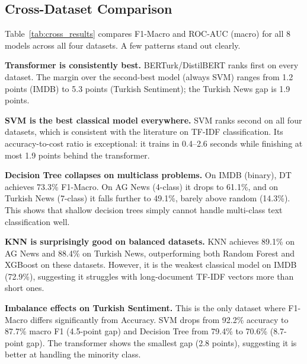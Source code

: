 \documentclass[conference]{IEEEtran}
\begin{document}
\subsection{Cross-Dataset Comparison}

Table~\ref{tab:cross_results} compares F1-Macro and ROC-AUC (macro) for all 8 models across
all four datasets. A few patterns stand out clearly.

\textbf{Transformer is consistently best.} BERTurk/DistilBERT ranks first on every dataset.
The margin over the second-best model (always SVM) ranges from 1.2 points (IMDB) to 5.3
points (Turkish Sentiment); the Turkish News gap is 1.9 points.

\textbf{SVM is the best classical model everywhere.} SVM ranks second on all four datasets,
which is consistent with the literature on TF-IDF classification. Its accuracy-to-cost ratio
is exceptional: it trains in 0.4--2.6 seconds while finishing at most 1.9 points behind the
transformer.

\textbf{Decision Tree collapses on multiclass problems.} On IMDB (binary), DT achieves
73.3\% F1-Macro. On AG News (4-class) it drops to 61.1\%, and on Turkish News (7-class) it
falls further to 49.1\%, barely above random (14.3\%). This shows that shallow decision
trees simply cannot handle multi-class text classification well.

\textbf{KNN is surprisingly good on balanced datasets.} KNN achieves 89.1\% on AG News
and 88.4\% on Turkish News, outperforming both Random Forest and XGBoost on these datasets.
However, it is the weakest classical model on IMDB (72.9\%), suggesting it struggles with
long-document TF-IDF vectors more than short ones.

\textbf{Imbalance effects on Turkish Sentiment.} This is the only dataset where F1-Macro
differs significantly from Accuracy. SVM drops from 92.2\% accuracy to 87.7\% macro F1
(4.5-point gap) and Decision Tree from 79.4\% to 70.6\% (8.7-point gap). The transformer
shows the smallest gap (2.8 points), suggesting it is better at handling the minority class.
\end{document}
